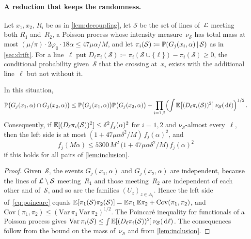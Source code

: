 \documentclass[11pt,letterpaper]{article}
\newcommand{\cS}{\mathcal S}
\begin{document}
\paragraph{A reduction that keeps the randomness.} Let $x_1,x_2$, $R_i$ be as in \cref{lem:decoupling}, let $\cS$ be the set of lines of~$\mathcal L$ meeting both $R_1$ and~$R_2$, a Poisson process whose intensity measure~$\nu_\cS$ has total mass at most $(\mu/\pi)\cdot2\varphi_0\cdot18\alpha\le47\mu\alpha/M$, and let $\pi_i(\cS)\coloneqq\P(G_j(x_i,\alpha)\,\vert\,\cS)$ as in \cref{sec:drift}. For a line~$\ell$ put $D_\ell\pi_i(\cS)\coloneqq\pi_i(\cS\cup\{\ell\})-\pi_i(\cS)\ge0$, the conditional probability given~$\cS$ that the crossing at~$x_i$ exists with the additional line~$\ell$ but not without it.

\begin{proposition}
\label{prop:poincare}
In this situation,
\begin{equation}
\label{eq:poincare}
  \P\bigl(G_j(x_1,\alpha)\cap G_j(x_2,\alpha)\bigr)\le\P\bigl(G_j(x_1,\alpha)\bigr)\P\bigl(G_j(x_2,\alpha)\bigr)+\prod_{i=1,2}\Bigl(\int\E\bigl[(D_\ell\pi_i(\cS))^2\bigr]\,\nu_\cS(\dd\ell)\Bigr)^{1/2}\,.
\end{equation}
Consequently, if $\E[(D_\ell\pi_i(\cS))^2]\le\delta^2f_j(\alpha)^2$ for $i=1,2$ and $\nu_\cS$-almost every~$\ell$, then the left side is at most $(1+47\mu\alpha\delta^2/M)\,f_j(\alpha)^2$, and
\begin{equation}
\label{eq:driftfree}
  f_j(M\alpha)\le5300\,M^2\,\bigl(1+47\mu\alpha\delta^2/M\bigr)\,f_j(\alpha)^2
\end{equation}
if this holds for all pairs of \cref{lem:inclusion}.
\end{proposition}

\begin{proof}
Given~$\cS$, the events $G_j(x_1,\alpha)$ and $G_j(x_2,\alpha)$ are independent, because the lines of $\cL\setminus\cS$ meeting~$R_1$ and those meeting~$R_2$ are independent of each other and of~$\cS$, and so are the families $(U_z)_{z\in A_i}$. Hence the left side of~\eqref{eq:poincare} equals $\E[\pi_1(\cS)\pi_2(\cS)]=\E\pi_1\,\E\pi_2+\mathrm{Cov}(\pi_1,\pi_2)$, and $\mathrm{Cov}(\pi_1,\pi_2)\le(\mathrm{Var}\,\pi_1\,\mathrm{Var}\,\pi_2)^{1/2}$. The Poincar\'e inequality for functionals of a Poisson process gives $\mathrm{Var}\,\pi_i(\cS)\le\int\E[(D_\ell\pi_i(\cS))^2]\,\nu_\cS(\dd\ell)$. The consequences follow from the bound on the mass of~$\nu_\cS$ and from \cref{lem:inclusion}.
\end{proof}
\end{document}
